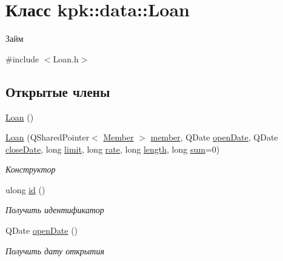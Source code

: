 \hypertarget{classkpk_1_1data_1_1_loan}{}\section{Класс kpk\+:\+:data\+:\+:Loan}
\label{classkpk_1_1data_1_1_loan}


Займ  




{\ttfamily \#include $<$Loan.\+h$>$}

\subsection*{Открытые члены}
\begin{DoxyCompactItemize}
\item 
\hyperlink{classkpk_1_1data_1_1_loan_a466384959c1ccfaf4942c96c3409e6e6}{Loan} ()
\item 
\hyperlink{classkpk_1_1data_1_1_loan_abf20833f3a4537c70b9e495ccef933a4}{Loan} (Q\+Shared\+Pointer$<$ \hyperlink{classkpk_1_1data_1_1_member}{Member} $>$ \hyperlink{classkpk_1_1data_1_1_loan_affe990a0811434de611bc365a377fc76}{member}, Q\+Date \hyperlink{classkpk_1_1data_1_1_loan_a0b039c0e6667da4f809f8e921f359f9b}{open\+Date}, Q\+Date \hyperlink{classkpk_1_1data_1_1_loan_af8ccbb954480eae0aa3b2a6b2f39fcb5}{close\+Date}, long \hyperlink{classkpk_1_1data_1_1_loan_ae82f80aa7a9b58fdfb2ac818dd33611d}{limit}, long \hyperlink{classkpk_1_1data_1_1_loan_affb2d1a39a5c7c185b07d5f6de87a43e}{rate}, long \hyperlink{classkpk_1_1data_1_1_loan_a89c1fd9e63d8923796f0cb3452bafa27}{length}, long \hyperlink{classkpk_1_1data_1_1_loan_a5b207380d82a2079ea83ec1ecf11f090}{sum}=0)
\begin{DoxyCompactList}\small\item\em Конструктор \end{DoxyCompactList}\item 
ulong \hyperlink{classkpk_1_1data_1_1_loan_a2827052c65d91b314bf1573ab56ffa3d}{id} ()
\begin{DoxyCompactList}\small\item\em Получить идентификатор \end{DoxyCompactList}\item 
Q\+Date \hyperlink{classkpk_1_1data_1_1_loan_a0b039c0e6667da4f809f8e921f359f9b}{open\+Date} ()
\begin{DoxyCompactList}\small\item\em Получить дату открытия \end{DoxyCompactList}\item 

\end{DoxyCompactItemize}
